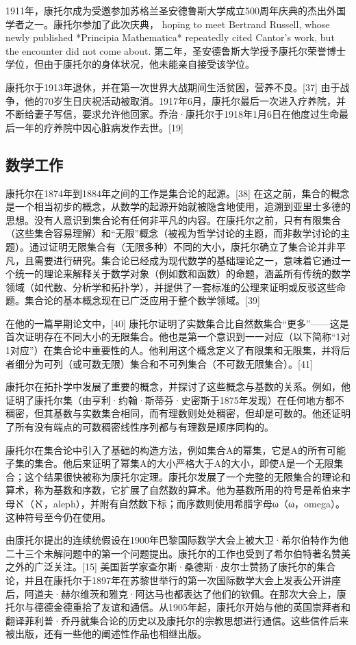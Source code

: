 1911年，康托尔成为受邀参加苏格兰圣安德鲁斯大学成立500周年庆典的杰出外国学者之一。康托尔参加了此次庆典， hoping to meet Bertrand Russell, whose newly published *Principia Mathematica* repeatedly cited Cantor's work, but the encounter did not come about. 第二年，圣安德鲁斯大学授予康托尔荣誉博士学位，但由于康托尔的身体状况，他未能亲自接受该学位。

康托尔于1913年退休，并在第一次世界大战期间生活贫困，营养不良。[37] 由于战争，他的70岁生日庆祝活动被取消。1917年6月，康托尔最后一次进入疗养院，并不断给妻子写信，要求允许他回家。乔治·康托尔于1918年1月6日在他度过生命最后一年的疗养院中因心脏病发作去世。[19]
\subsection{数学工作}  
康托尔在1874年到1884年之间的工作是集合论的起源。[38] 在这之前，集合的概念是一个相当初步的概念，从数学的起源开始就被隐含地使用，追溯到亚里士多德的思想。没有人意识到集合论有任何非平凡的内容。在康托尔之前，只有有限集合（这些集合容易理解）和“无限”概念（被视为哲学讨论的主题，而非数学讨论的主题）。通过证明无限集合有（无限多种）不同的大小，康托尔确立了集合论并非平凡，且需要进行研究。集合论已经成为现代数学的基础理论之一，意味着它通过一个统一的理论来解释关于数学对象（例如数和函数）的命题，涵盖所有传统的数学领域（如代数、分析学和拓扑学），并提供了一套标准的公理来证明或反驳这些命题。集合论的基本概念现在已广泛应用于整个数学领域。[39]

在他的一篇早期论文中，[40] 康托尔证明了实数集合比自然数集合“更多”——这是首次证明存在不同大小的无限集合。他也是第一个意识到一一对应（以下简称“1对1对应”）在集合论中重要性的人。他利用这个概念定义了有限集和无限集，并将后者细分为可列（或可数无限）集合和不可列集合（不可数无限集合）。[41]

康托尔在拓扑学中发展了重要的概念，并探讨了这些概念与基数的关系。例如，他证明了康托尔集（由亨利·约翰·斯蒂芬·史密斯于1875年发现）在任何地方都不稠密，但其基数与实数集合相同，而有理数则处处稠密，但却是可数的。他还证明了所有没有端点的可数稠密线性序列都与有理数是顺序同构的。

康托尔在集合论中引入了基础的构造方法，例如集合A的幂集，它是A的所有可能子集的集合。他后来证明了幂集A的大小严格大于A的大小，即使A是一个无限集合；这个结果很快被称为康托尔定理。康托尔发展了一个完整的无限集合的理论和算术，称为基数和序数，它扩展了自然数的算术。他为基数所用的符号是希伯来字母ℵ（ℵ，aleph），并附有自然数下标；而序数则使用希腊字母ω（ω，omega）。这种符号至今仍在使用。

由康托尔提出的连续统假设在1900年巴黎国际数学大会上被大卫·希尔伯特作为他二十三个未解问题中的第一个问题提出。康托尔的工作也受到了希尔伯特著名赞美之外的广泛关注。[15] 美国哲学家查尔斯·桑德斯·皮尔士赞扬了康托尔的集合论，并且在康托尔于1897年在苏黎世举行的第一次国际数学大会上发表公开讲座后，阿道夫·赫尔维茨和雅克·阿达马也都表达了他们的钦佩。在那次大会上，康托尔与德德金德重拾了友谊和通信。从1905年起，康托尔开始与他的英国崇拜者和翻译菲利普·乔丹就集合论的历史以及康托尔的宗教思想进行通信。这些信件后来被出版，还有一些他的阐述性作品也相继出版。
